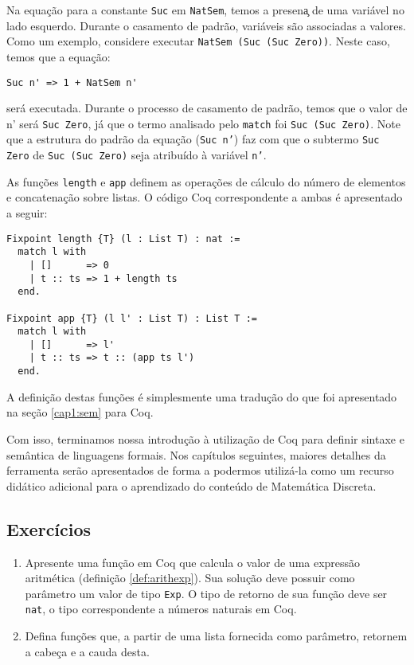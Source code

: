 Na equa\c{c}\~ao para a constante \texttt{Suc} em \texttt{NatSem},
temos a presen\c{a} de uma vari\'avel no lado esquerdo. Durante o
casamento de padr\~ao, vari\'aveis s\~ao associadas a valores. Como um
exemplo, considere executar \texttt{NatSem (Suc (Suc Zero))}. Neste
caso, temos que a equa\c{c}\~ao:
\begin{lstlisting}
Suc n' => 1 + NatSem n'
\end{lstlisting}
ser\'a executada. Durante o processo de casamento de padr\~ao, temos
que o valor de n' ser\'a \texttt{Suc Zero}, j\'a que o termo analisado
pelo \texttt{match} foi \texttt{Suc (Suc Zero)}. Note que a estrutura
do padr\~ao da equa\c{c}\~ao (\texttt{Suc n'})  faz com que o subtermo
\texttt{Suc Zero} de \texttt{Suc (Suc Zero)} seja atribu\'ido \`a
vari\'avel \texttt{n'}.

As fun\c{c}\~oes \texttt{length} e \texttt{app} definem as
opera\c{c}\~oes de c\'alculo do n\'umero de elementos e
concatena\c{c}\~ao sobre listas. O c\'odigo Coq correspondente a ambas
\'e apresentado a seguir:

\begin{lstlisting}
Fixpoint length {T} (l : List T) : nat :=
  match l with
    | []      => 0
    | t :: ts => 1 + length ts
  end.

Fixpoint app {T} (l l' : List T) : List T :=
  match l with
    | []      => l'
    | t :: ts => t :: (app ts l')
  end.
\end{lstlisting}
A defini\c{c}\~ao destas fun\c{c}\~oes \'e simplesmente uma
tradu\c{c}\~ao do que foi apresentado na se\c{c}\~ao \ref{cap1:sem}
para Coq.

Com isso, terminamos nossa introdu\c{c}\~ao \`a utiliza\c{c}\~ao de
Coq para definir sintaxe e sem\^antica de linguagens formais. Nos
capítulos seguintes, maiores detalhes da ferramenta ser\~ao
apresentados de forma a podermos utiliz\'a-la como um recurso
did\'atico adicional para o aprendizado do conte\'udo de Matem\'atica Discreta.

\subsection{Exerc\'icios}

\begin{enumerate}
    \item Apresente uma fun\c{c}\~ao em Coq que calcula o valor de uma express\~ao aritm\'etica (defini\c{c}\~ao \ref{def:arithexp}).
        Sua solu\c{c}\~ao deve possuir como par\^ametro um valor de
        tipo \texttt{Exp}. O tipo de retorno de sua fun\c{c}\~ao deve
        ser \texttt{nat}, o tipo correspondente a n\'umeros naturais
        em Coq. 
    \item Defina fun\c{c}\~oes que, a partir de uma lista fornecida
      como par\^ametro, retornem a cabe\c{c}a e a cauda desta.
\end{enumerate}

